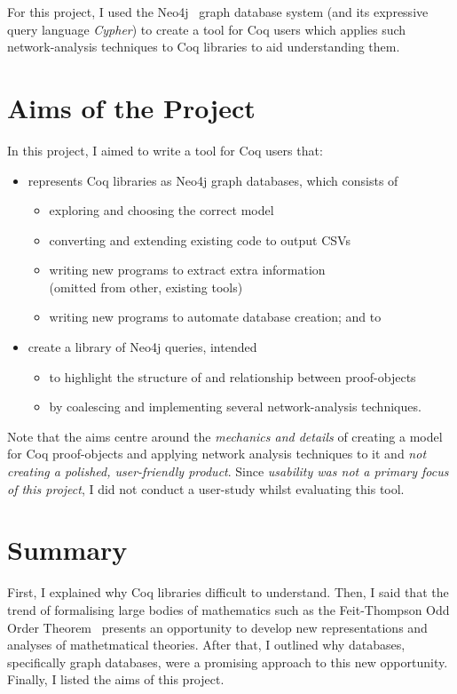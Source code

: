 \newpage
For this project, I used the Neo4j~\cite{neo4j} graph database system (and its
expressive query language \emph{Cypher}) to create a tool for Coq users which
applies such network-analysis techniques to Coq libraries to aid understanding
them.

\section{Aims of the Project}\label{intro:aims}

In this project, I aimed to write a tool for Coq users that:

\begin{itemize}
\item represents Coq libraries as Neo4j graph databases, which consists of
  \begin{itemize}
  \item exploring and choosing the correct model
  \item converting and extending existing code to output CSVs
  \item writing new programs to extract extra information \\
      (omitted from other, existing tools)
  \item writing new programs to automate database creation; and to
  \end{itemize}

\item create a library of Neo4j queries, intended
  \begin{itemize}
  \item to highlight the structure of and relationship between proof-objects
  \item by coalescing and implementing several network-analysis techniques.
  \end{itemize}
\end{itemize}

Note that the aims centre around the \emph{mechanics and details} of creating a
model for Coq proof-objects and applying network analysis techniques to it and
\emph{not creating a polished, user-friendly product}. Since \emph{usability was
not a \emph{primary} focus of this project}, I did not conduct a user-study whilst
evaluating this tool.

\newpage

\section{Summary}

First, I explained why Coq libraries difficult to understand. Then, I said
that the trend of formalising large bodies of mathematics such as the
Feit-Thompson Odd Order Theorem~\cite{peterfalvi2000oot, bender1994oot}
presents an opportunity to develop new representations and analyses of
mathetmatical theories. After that, I outlined why databases, specifically
graph databases, were a promising approach to this new opportunity. Finally, I
listed the aims of this project.
